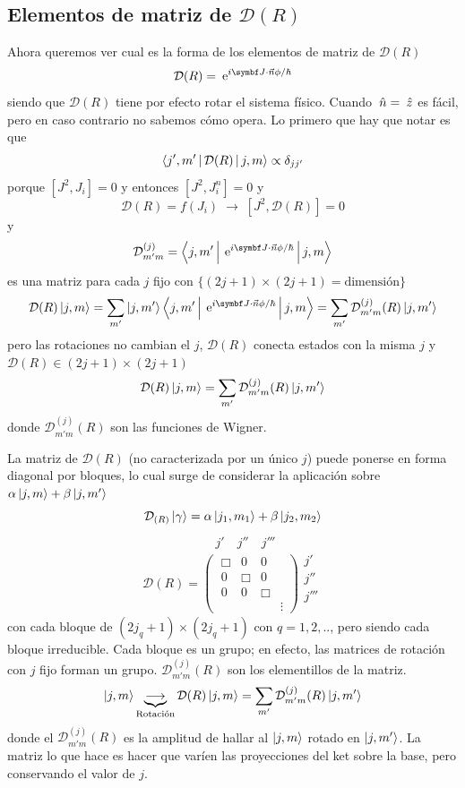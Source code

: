 \documentclass[10pt,oneside]{CBFT_book}
\begin{document}
\subsection{Elementos de matriz de $\mathcal{D}(R)$}

Ahora queremos ver cual es la forma de los elementos de matriz de $\mathcal{D}(R)$
\[
	\mathcal{D}(R) = \euler^{i \vb{J}\cdot\vec{n}\phi/\hbar}
\]
siendo que $\mathcal{D}(R)$ tiene por efecto rotar el sistema físico.
Cuando $\:\hat{n} = \:\hat{z} $ es fácil, pero en caso contrario no sabemos cómo opera.
Lo primero que hay que notar es que 
\[
	\Braket{j',m'|\mathcal{D}(R)|j,m}  \propto \delta_{jj'}
\]
porque $[J^2,J_i]=0$ y entonces $[J^2,J_i^n]=0$ y 
\[
	\mathcal{D}(R) = f(J_i) \; \longrightarrow \; [ J^2, \mathcal{D}(R) ] = 0
\]
y 
\[
	\mathcal{D}^{(j)}_{m' m} =  \Braket{j,m'|\euler^{i \vb{J}\cdot\vec{n}\phi/\hbar}|j,m} 
\]
es una matriz para cada $j$ fijo con $\{ (2j+1)\times(2j+1)=\text{dimensión}\}$
\[
	\mathcal{D}(R)\Ket{j,m} = \sum_{m'} \ket{j,m'}\Braket{j,m'|\euler^{i \vb{J}\cdot\vec{n}\phi/\hbar}|j,m} 
	= \sum_{m'} \mathcal{D}^{(j)}_{m' m}(R) \Ket{j,m'} 
\]
pero las rotaciones no cambian el $j$, $\mathcal{D}(R)$ conecta estados con la misma $j$ y $\mathcal{D}(R) 
\in (2j+1)\times(2j+1)$ 
\[
	\mathcal{D}(R)\Ket{j,m} = \sum_{m'} \mathcal{D}^{(j)}_{m' m}(R) \Ket{j,m'} 
\]
donde $\mathcal{D}^{(j)}_{m' m}(R)$ son las funciones de Wigner.

La matriz de $\mathcal{D}(R)$ (no caracterizada por un único $j$) puede ponerse en forma diagonal por bloques,
lo cual surge de considerar la aplicación sobre $ \alpha \Ket{j,m} + \beta \Ket{j,m'} $
\[
	\mathcal{D}_{(R)}\Ket{\gamma} = \alpha \Ket{j_1,m_1} + \beta \Ket{j_2,m_2}
\]
\[
\begin{matrix} \qquad j' \quad j'' \quad j''' \end{matrix}
\]
\[
	\mathcal{D}(R) = \begin{pmatrix}
	\; \Box & 0 & 0 & \\
	\; 0 & \Box & 0 & \\
	\; 0 & 0 & \Box & \\
	\; & & & \vdots
	\end{pmatrix} \begin{matrix} j' \\ j'' \\ j'''\\ \\ \end{matrix}
\]
con cada bloque de $(2j_q+1)\times(2j_q+1)$ con $q=1,2,..$, pero siendo cada bloque irreducible. 
Cada bloque es un grupo; en efecto, las matrices de rotación con $j$ fijo forman un grupo. 
$\mathcal{D}_{m'm}^{(j)}(R)$ son los elementillos de la matriz.
\[
	\Ket{j,m} \underbrace{\longrightarrow}_{\text{Rotación}} \mathcal{D}(R)\Ket{j,m} =
	 \sum_{m'} \mathcal{D}^{(j)}_{m' m}(R) \Ket{j,m'} 
\]
donde el $\mathcal{D}^{(j)}_{m' m}(R)$ es la amplitud de hallar al $\Ket{j,m}$ rotado en $\Ket{j,m'}$.
La matriz lo que hace es hacer que varíen las proyecciones del ket sobre la base, pero conservando
el valor de $j$.
\end{document}
